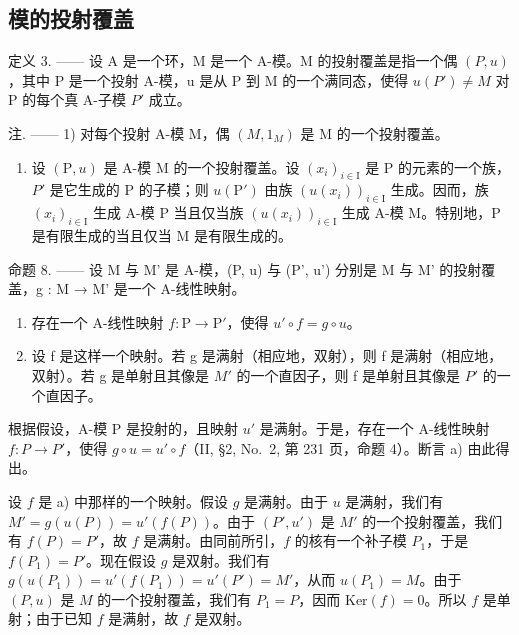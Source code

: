 \subsection{模的投射覆盖}

定义 3. —— 设 A 是一个环，M 是一个 A-模。M 的投射覆盖是指一个偶 \((P, u)\)，其中 P 是一个投射 A-模，u 是从 P 到 M 的一个满同态，使得 \(u(P') \neq M\) 对 P 的每个真 A-子模 \(P'\) 成立。

注. —— 1) 对每个投射 A-模 M，偶 \((M,1_{M})\) 是 M 的一个投射覆盖。

\begin{enumerate}
\def\labelenumi{\arabic{enumi})}
\setcounter{enumi}{1}
\tightlist
\item
  设 \((\mathrm{P}, u)\) 是 A-模 M 的一个投射覆盖。设 \((x_{i})_{i \in \mathrm{I}}\) 是 P 的元素的一个族，\(P'\) 是它生成的 P 的子模；则 \(u(\mathrm{P}')\) 由族 \((u(x_{i}))_{i \in \mathrm{I}}\) 生成。因而，族 \((x_{i})_{i \in \mathrm{I}}\) 生成 A-模 P 当且仅当族 \((u(x_{i}))_{i \in \mathrm{I}}\) 生成 A-模 M。特别地，P 是有限生成的当且仅当 M 是有限生成的。
\end{enumerate}

命题 8. —— 设 M 与 M' 是 A-模，(P, u) 与 (P', u') 分别是 M 与 M' 的投射覆盖，g : M → M' 是一个 A-线性映射。

\begin{enumerate}
\def\labelenumi{\alph{enumi})}
\item
  存在一个 A-线性映射 \(f: \mathrm{P} \to \mathrm{P}'\)，使得 \(u' \circ f = g \circ u\)。
\item
  设 f 是这样一个映射。若 g 是满射（相应地，双射），则 f 是满射（相应地，双射）。若 g 是单射且其像是 \(M'\) 的一个直因子，则 f 是单射且其像是 \(P'\) 的一个直因子。
\end{enumerate}

根据假设，A-模 P 是投射的，且映射 \(u'\) 是满射。于是，存在一个 A-线性映射 \(f: P \to P'\)，使得 \(g \circ u = u' \circ f\)（II, §2, No.~2, 第 231 页，命题 4）。断言 a) 由此得出。

设 \(f\) 是 a) 中那样的一个映射。假设 \(g\) 是满射。由于 \(u\) 是满射，我们有 \(M' = g(u(P)) = u'(f(P))\)。由于 \((P', u')\) 是 \(M'\) 的一个投射覆盖，我们有 \(f(P) = P'\)，故 \(f\) 是满射。由同前所引，\(f\) 的核有一个补子模 \(P_1\)，于是 \(f(P_1) = P'\)。现在假设 \(g\) 是双射。我们有 \(g(u(P_1)) = u'(f(P_1)) = u'(P') = M'\)，从而 \(u(P_1) = M\)。由于 \((P, u)\) 是 \(M\) 的一个投射覆盖，我们有 \(P_1 = P\)，因而 \(\text{Ker}(f) = 0\)。所以 \(f\) 是单射；由于已知 \(f\) 是满射，故 \(f\) 是双射。

